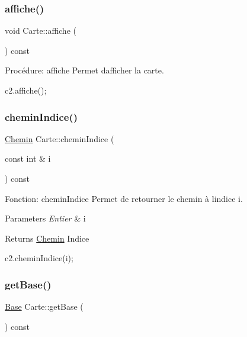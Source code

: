 \subsubsection{\texorpdfstring{affiche()}{affiche()}}
{\footnotesize\ttfamily void Carte\+::affiche (\begin{DoxyParamCaption}{ }\end{DoxyParamCaption}) const}



Procédure\+: affiche Permet d\textquotesingle{}afficher la carte. 


\begin{DoxyCode}
c2.affiche();
\end{DoxyCode}
 \mbox{\label{classCarte_a6cef034e71ce9b1d39f8ddd73dbaa746}} 
\subsubsection{\texorpdfstring{chemin\+Indice()}{cheminIndice()}}
{\footnotesize\ttfamily \hyperlink{classChemin}{Chemin} Carte\+::chemin\+Indice (\begin{DoxyParamCaption}\item[{const int \&}]{i }\end{DoxyParamCaption}) const}



Fonction\+: chemin\+Indice Permet de retourner le chemin à l\textquotesingle{}indice i. 


\begin{DoxyParams}{Parameters}
{\em Entier} & i \\
\hline
\end{DoxyParams}
\begin{DoxyReturn}{Returns}
\hyperlink{classChemin}{Chemin} Indice 
\begin{DoxyCode}
c2.cheminIndice(i);
\end{DoxyCode}
 
\end{DoxyReturn}
\mbox{\label{classCarte_ae849d9931469bda9845a90791a2067de}} 
\subsubsection{\texorpdfstring{get\+Base()}{getBase()}}
{\footnotesize\ttfamily \hyperlink{classBase}{Base} Carte\+::get\+Base (\begin{DoxyParamCaption}{ }\end{DoxyParamCaption}) const}



